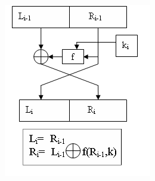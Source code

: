 \documentclass[a4paper,12pt]{article}
\newenvironment{Figure}
	{\par\medskip\noindent\minipage{\linewidth}}
	{\endminipage\par\medskip}
\theoremstyle{definition}
\begin{document}
		
	\begin{multicols}{2}
        \begin{Figure}
			\centering
			\includegraphics[width=\linewidth]{round.png}
		\end{Figure}


\end{multicols}
\end{document}
